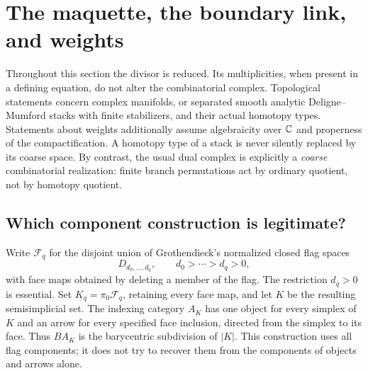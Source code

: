 \section{The maquette, the boundary link, and weights}
\label{sec:maquette}

Throughout this section the divisor is reduced.  Its multiplicities, when present in a defining equation, do not alter the combinatorial complex.  Topological statements concern complex manifolds, or separated smooth analytic Deligne--Mumford stacks with finite stabilizers, and their actual homotopy types.  Statements about weights additionally assume algebraicity over $\mathbb C$ and properness of the compactification.  A homotopy type of a stack is never silently replaced by its coarse space.  By contrast, the usual dual complex is explicitly a \emph{coarse} combinatorial realization: finite branch permutations act by ordinary quotient, not by homotopy quotient.

\subsection{Which component construction is legitimate?}

Write $\mathcal F_q$ for the disjoint union of Grothendieck's normalized closed flag spaces
\[
 D_{d_0,\ldots,d_q},\qquad d_0>\cdots>d_q>0,
\]
with face maps obtained by deleting a member of the flag.  The restriction $d_q>0$ is essential.  Set $K_q=\pi_0\mathcal F_q$, retaining every face map, and let $K$ be the resulting semisimplicial set.  The indexing category $A_K$ has one object for every simplex of $K$ and an arrow for every specified face inclusion, directed from the simplex to its face.  Thus $BA_K$ is the barycentric subdivision of $|K|$.  This construction uses all flag components; it does not try to recover them from the components of objects and arrows alone.

